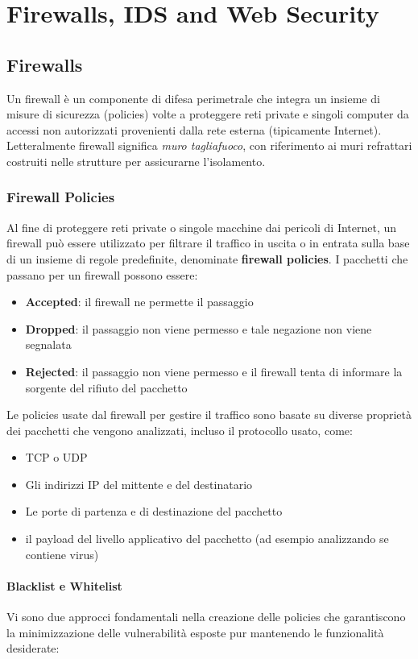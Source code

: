 \chapter{Firewalls, IDS and Web Security}
\section{Firewalls}
Un firewall è un componente di difesa perimetrale che integra un insieme di misure di sicurezza (policies) volte a proteggere reti private e
singoli computer da accessi non autorizzati provenienti dalla rete esterna (tipicamente Internet). Letteralmente firewall significa \textit{muro tagliafuoco}, con riferimento ai muri refrattari costruiti nelle strutture per assicurarne l'isolamento.

\subsection{Firewall Policies}
Al fine di proteggere reti private o singole macchine dai pericoli di Internet, un firewall può essere utilizzato per filtrare il traffico in uscita o in entrata sulla base di un insieme di regole predefinite, denominate \textbf{firewall policies}.
I pacchetti che passano per un firewall possono essere:
\begin{itemize}
\item \textbf{Accepted}: il firewall ne permette il passaggio
\item \textbf{Dropped}: il passaggio non viene permesso e tale negazione non viene segnalata
\item  \textbf{Rejected}: il passaggio non viene permesso e il firewall tenta di informare la sorgente del rifiuto del pacchetto 
\end{itemize}
Le policies usate dal firewall per gestire il traffico sono basate su diverse proprietà dei pacchetti che vengono analizzati, incluso il protocollo usato, come:
\begin{itemize}
\item TCP o UDP
\item Gli indirizzi IP del mittente e del destinatario
\item Le porte di partenza e di destinazione del pacchetto
\item il payload del livello applicativo del pacchetto (ad esempio analizzando se contiene virus)
\end{itemize}
\subsubsection{Blacklist e Whitelist}
Vi sono due approcci fondamentali nella creazione delle policies che garantiscono la minimizzazione delle vulnerabilità esposte pur mantenendo le funzionalità desiderate:

